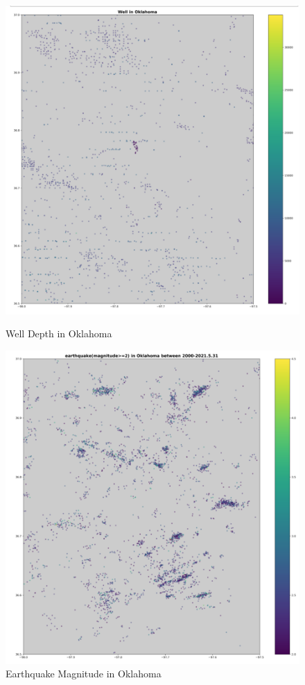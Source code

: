 \documentclass[project-plan]{report-template}
\begin{document}
\begin{figure}
    \begin{minipage}[t]{0.5\linewidth}
      \centering
      \includegraphics[scale=0.4]{well.png}
      \caption{Well Depth in Oklahoma}
      \label{fig:well}
    \end{minipage}%
    \begin{minipage}[t]{0.5\linewidth}
      \centering
      \includegraphics[scale=0.4]{earthquake.png}
      \caption{Earthquake Magnitude in Oklahoma}
      \label{fig:earthquake}
    \end{minipage}
  \end{figure}
\end{document}
